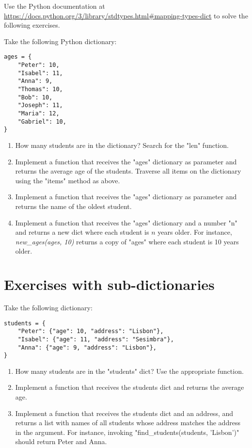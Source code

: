 Use the Python documentation at \url{https://docs.python.org/3/library/stdtypes.html#mapping-types-dict} to solve the following exercises.

Take the following Python dictionary:

\begin{verbatim}
ages = {
    "Peter": 10,
    "Isabel": 11,
    "Anna": 9,
    "Thomas": 10,
    "Bob": 10,
    "Joseph": 11,
    "Maria": 12,
    "Gabriel": 10,
}
\end{verbatim}

\begin{enumerate}

\item How many students are in the dictionary? Search for the "len" function.

\item Implement a function that receives the "ages" dictionary as parameter and returns the average age of the students. Traverse all items on the dictionary using the "items" method as above.

\item Implement a function that receives the "ages" dictionary as parameter and returns the name of the oldest student.

\item Implement a function that receives the "ages" dictionary and a number "n" and returns a new dict where each student is $n$ years older. For instance, \textit{new\_ages(ages, 10)} returns a copy of "ages" where each student is 10 years older.

\end{enumerate}

\section{Exercises with sub-dictionaries}

Take the following dictionary:

\begin{verbatim}
students = {
    "Peter": {"age": 10, "address": "Lisbon"},
    "Isabel": {"age": 11, "address": "Sesimbra"},
    "Anna": {"age": 9, "address": "Lisbon"},
}
\end{verbatim}

\begin{enumerate}

\item How many students are in the "students" dict? Use the appropriate function.

\item Implement a function that receives the students dict and returns the average age.

\item Implement a function that receives the students dict and an address, and returns a list with names of all students whose address matches the address in the argument. For instance, invoking "find\_students(students, 'Lisbon')" should return Peter and Anna.

\end{enumerate}
